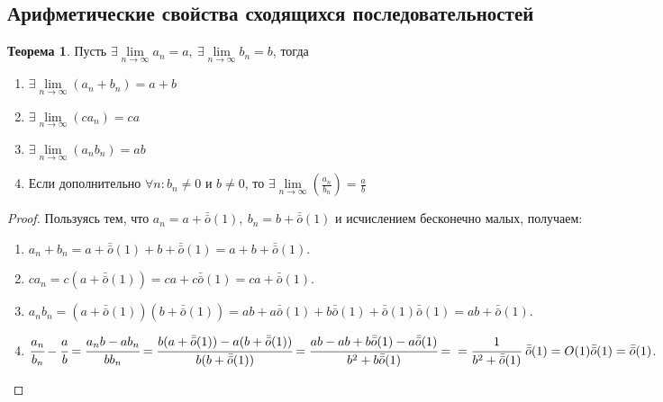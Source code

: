 \documentclass[a4paper, 12pt]{article}
\renewcommand{\epsilon}{\varepsilon}
\renewcommand{\emptyset}{\varnothing}
\newcommand{\om}{\bar{\bar{o}}}
\theoremstyle{definition}
\newtheorem*{theorem}{Теорема}
\newtheorem*{comm}{Замечание}
\begin{document}
    \subsection{Арифметические свойства сходящихся последовательностей}
        \begin{theorem}
            Пусть $\exists \lim\limits_{n\to\infty} a_n=a,\ \exists \lim\limits_{n\to\infty} b_n=b$, тогда
            \begin{enumerate}
                \item $\exists \lim\limits_{n\to\infty} (a_n+b_n) = a+b$
                \item $\exists \lim\limits_{n\to\infty} (ca_n) = ca$
                \item $\exists \lim\limits_{n\to\infty} (a_n b_n) = ab$
                \item Если дополнительно $\forall n: b_n\ne 0$ и $b\ne 0$, то $\exists \lim\limits_{n\to\infty} (\frac{a_n}{b_n})=\frac{a}{b}$
            \end{enumerate}
        \end{theorem} 
        \begin{proof}
            Пользуясь тем, что $a_n=a+\bar{\bar{o}}{(1)},\ b_n=b+\bar{\bar{o}}{(1)}$ и исчислением бесконечно малых, получаем:
            \begin{enumerate}
                \item $a_n+b_n=a+\om(1)+b+\om(1)=a+b+\om(1)$.
                \item $ca_n=c(a+\om(1))=ca+c\om(1)=ca+\bar{\bar{o}}{(1)}$.
                \item $a_n b_n=(a+\om(1))(b+\om(1))=ab+a \bar{\bar{o}}{(1)}+b \bar{\bar{o}}{(1)}+\bar{\bar{o}}{(1)}\bar{\bar{o}}{(1)}=ab+\bar{\bar{o}}{(1)}$.
                \item $\cfrac{a_n}{b_n}-\cfrac{a}{b}=\cfrac{a_n b-ab_n}{bb_n}=\cfrac{b(a+\bar{\bar{o}}{(1)})-a(b+\bar{\bar{o}}{(1)})}{b(b+\bar{\bar{o}}{(1)})}=\cfrac{ab-ab+b \bar{\bar{o}}{(1)}-a \bar{\bar{o}}{(1)}}{b^2+b \bar{\bar{o}}{(1)}}=\\=\cfrac{1}{b^2+\bar{\bar{o}}{(1)}}\ \bar{\bar{o}}{(1)}=O(1) \bar{\bar{o}}{(1)}=\bar{\bar{o}}{(1)}$.
            \end{enumerate}
        \end{proof}
\end{document}
